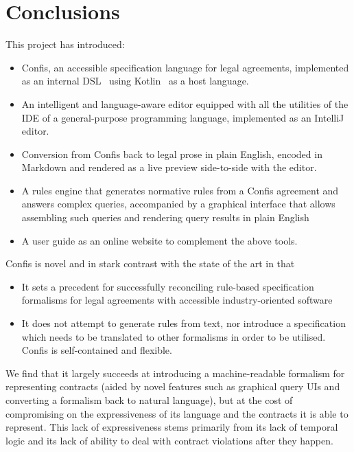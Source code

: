 \chapter{Conclusions}\label{ch:conclusions}

This project has introduced:
\begin{itemize}
    \item Confis, an accessible specification language for legal agreements, implemented as an internal DSL~\cite{fowlerDsl} using Kotlin~\cite{kotlinLang} as a host language.
    \item An intelligent and language-aware editor equipped with all the utilities of the IDE of a general-purpose programming language, implemented as an IntelliJ~\cite{intelliJRepo} editor.
    \item Conversion from Confis back to legal prose in plain English, encoded in Markdown and rendered as a live preview side-to-side with the editor.
    \item A rules engine that generates normative rules from a Confis agreement and answers complex queries, accompanied by a graphical interface that allows assembling such queries and rendering query results in plain English
    \item A user guide as an online website to complement the above tools.
\end{itemize}

Confis is novel and in stark contrast with the state of the art in that
\begin{itemize}
    \item It sets a precedent for successfully reconciling rule-based specification formalisms for legal agreements with accessible industry-oriented software
    \item It does not attempt to generate rules from text, nor introduce a specification which needs to be translated to other formalisms in order to be utilised.
    Confis is self-contained and flexible.
\end{itemize}

We find that it largely succeeds at introducing a machine-readable formalism for representing contracts (aided by novel features such as graphical query UIs and converting a formalism back to natural language), but at the cost of compromising on the expressiveness of its language and the contracts it is able to represent.
This lack of expressiveness stems primarily from its lack of temporal logic and its lack of ability to deal with contract violations after they happen.


